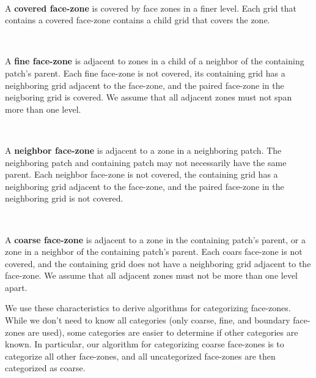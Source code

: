 \documentclass[10pt]{article}
\begin{document}
\begin{minipage}{1in}
\end{minipage} \
\begin{minipage}{5.8in}
A \textbf{covered face-zone} is covered by face zones in a finer
level.  Each grid that contains a covered face-zone contains a child
grid that covers the zone.
\end{minipage}

\begin{minipage}{1in}
\end{minipage} \
\begin{minipage}{5.8in}
A \textbf{fine face-zone} is adjacent to zones in a child of a
neighbor of the containing patch's parent.  Each fine face-zone is not
covered, its containing grid has a neighboring grid adjacent to the
face-zone, and the paired face-zone in the neigboring grid is covered.
We assume that all adjacent zones must not span more than one level.
\end{minipage}


\begin{minipage}{1in}
\end{minipage} \
\begin{minipage}{5.8in}
A \textbf{neighbor face-zone} is adjacent to a zone in a neighboring
patch.  The neighboring patch and containing patch may not necessarily
have the same parent.  Each neighbor face-zone is not covered, the
containing grid has a neighboring grid adjacent to the face-zone, and
the paired face-zone in the neighboring grid is not covered.
\end{minipage}

\begin{minipage}{1in}
\end{minipage} \
\begin{minipage}{5.8in}
A \textbf{coarse face-zone} is adjacent to a zone in the containing
patch's parent, or a zone in a neighbor of the containing patch's
parent.  Each coars face-zone is not covered, and the containing grid
does not have a neighboring grid adjacent to the face-zone.  We assume
that all adjacent zones must not be more than one level apart.
\end{minipage}


We use these characteristics to derive algorithms for categorizing
face-zones.  While we don't need to know all categories (only coarse,
fine, and boundary face-zones are used), some categories are easier to
determine if other categories are known.  In particular, our algorithm
for categorizing coarse face-zones is to categorize all other
face-zones, and all uncategorized face-zones are then categorized as
coarse.
\end{document}
